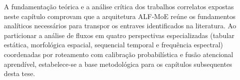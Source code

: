 A fundamentação teórica e a análise crítica dos trabalhos correlatos expostas neste capítulo comprovam que a arquitetura ALF-MoE reúne os fundamentos analíticos necessários para transpor os entraves identificados na literatura. Ao particionar a análise de fluxos em quatro perspectivas especializadas (tabular estática, morfológica espacial, sequencial temporal e frequência espectral) coordenadas por roteamento com calibração probabilística e fusão atencional aprendível, estabelece-se a base metodológica para os capítulos subsequentes desta tese.
